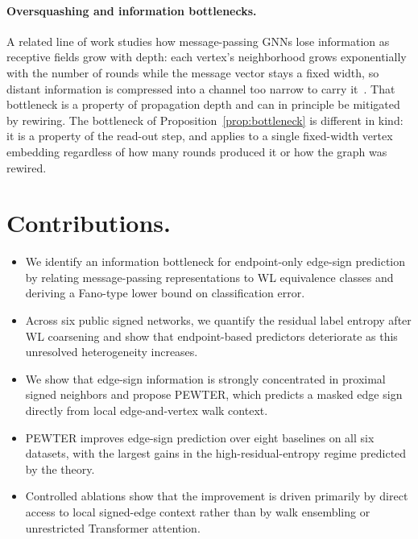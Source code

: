 \documentclass[sigconf, review, anonymous]{acmart}
\newcounter{ablation}
\theoremstyle{plain}
\theoremstyle{definition}
\begin{document}
\paragraph{Oversquashing and information bottlenecks.} A related line of work studies how message-passing GNNs lose information as receptive fields grow with depth: each vertex's neighborhood grows exponentially with the number of rounds while the message vector stays a fixed width, so distant information is compressed into a channel too narrow to carry it~\citep{alon2021bottleneck, topping2022understanding}. That bottleneck is a property of propagation depth and can in principle be mitigated by rewiring. The bottleneck of Proposition~\ref{prop:bottleneck} is different in kind: it is a property of the read-out step, and applies to a single fixed-width vertex embedding regardless of how many rounds produced it or how the graph was rewired.

\section{Contributions.}
\begin{itemize}
\item We identify an information bottleneck for endpoint-only edge-sign prediction by relating message-passing representations to WL equivalence classes and deriving a Fano-type lower bound on classification error.
\item Across six public signed networks, we quantify the residual label entropy after WL coarsening and show that endpoint-based predictors deteriorate as this unresolved heterogeneity increases.
\item We show that edge-sign information is strongly concentrated in proximal signed neighbors and propose PEWTER, which predicts a masked edge sign directly from local edge-and-vertex walk context.
\item PEWTER improves edge-sign prediction over eight baselines on all six datasets, with the largest gains in the high-residual-entropy regime predicted by the theory.
\item Controlled ablations show that the improvement is driven primarily by direct access to local signed-edge context rather than by walk ensembling or unrestricted Transformer attention.
\end{itemize}
\end{document}

